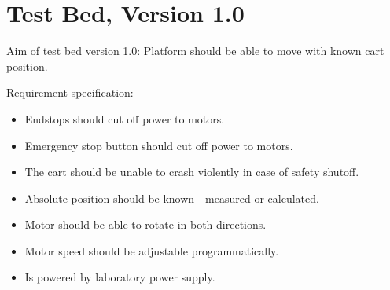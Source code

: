 


\section{Test Bed, Version 1.0}

Aim of test bed version 1.0: Platform should be able to move with known cart position.


Requirement specification:

\begin{itemize}
	\item Endstops should cut off power to motors.
	\item Emergency stop button should cut off power to motors.
	\item The cart should be unable to crash violently in case of safety shutoff.
	\item Absolute position should be known - measured or calculated.
	\item Motor should be able to rotate in both directions.	
	\item Motor speed should be adjustable programmatically.
	\item Is powered by laboratory power supply.
\end{itemize}